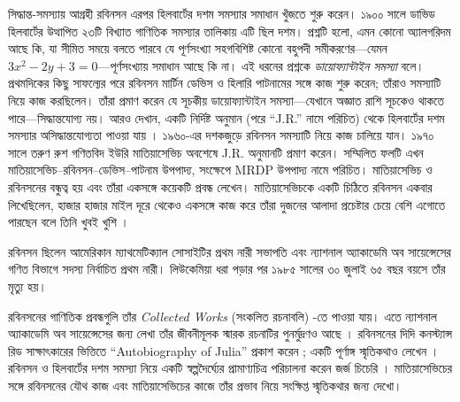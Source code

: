 \documentclass[../../../include/open-logic-section]{subfiles}
\begin{document}
সিদ্ধান্ত-সমস্যায় আগ্রহী রবিনসন এরপর
হিলবার্টের দশম সমস্যার সমাধান খুঁজতে শুরু
করেন। ১৯০০ সালে ডাভিড হিলবার্টের উত্থাপিত
২৩টি বিখ্যাত গাণিতিক সমস্যার তালিকায়
এটি ছিল দশম। প্রশ্নটি হলো, এমন কোনো
অ্যালগরিদম আছে কি, যা সীমিত সময়ে
বলতে পারবে যে পূর্ণসংখ্যা সহগবিশিষ্ট
কোনো বহুপদী সমীকরণের—যেমন
$3x^2 - 2y +3 = 0$—পূর্ণসংখ্যায় সমাধান
আছে কি না। এই ধরনের প্রশ্নকে
\emph{ডায়োফ্যান্টাইন সমস্যা} বলে। প্রথমদিকের
কিছু সাফল্যের পরে রবিনসন মার্টিন ডেভিস
ও হিলারি পাটনামের সঙ্গে কাজ শুরু করেন;
তাঁরাও সমস্যাটি নিয়ে কাজ করছিলেন।
তাঁরা প্রমাণ করেন যে সূচকীয় ডায়োফ্যান্টাইন
সমস্যা—যেখানে অজ্ঞাত রাশি সূচকেও থাকতে
পারে—সিদ্ধান্তযোগ্য নয়। আরও দেখান, একটি
নির্দিষ্ট অনুমান (পরে “J.R.” নামে পরিচিত)
থেকে হিলবার্টের দশম সমস্যার অসিদ্ধান্তযোগ্যতা
পাওয়া যায় \citep{DavisPutnamRobinson1961}।
১৯৬০-এর দশকজুড়ে রবিনসন সমস্যাটি নিয়ে
কাজ চালিয়ে যান। ১৯৭০ সালে তরুণ রুশ
গণিতবিদ ইউরি মাতিয়াসেভিচ অবশেষে J.R.
অনুমানটি প্রমাণ করেন। সম্মিলিত ফলটি এখন
মাতিয়াসেভিচ--রবিনসন--ডেভিস--পাটনাম
উপপাদ্য, সংক্ষেপে MRDP উপপাদ্য নামে
পরিচিত। মাতিয়াসেভিচ ও রবিনসনের বন্ধুত্ব
হয় এবং তাঁরা একসঙ্গে কয়েকটি প্রবন্ধ লেখেন।
মাতিয়াসেভিচকে একটি চিঠিতে রবিনসন একবার
লিখেছিলেন, হাজার হাজার মাইল দূরে থেকেও
একসঙ্গে কাজ করে তাঁরা দুজনের আলাদা
প্রচেষ্টার চেয়ে বেশি এগোতে পারছেন বলে
তিনি খুবই খুশি \citep[45]{Matijasevich1992}।

রবিনসন ছিলেন আমেরিকান ম্যাথমেটিক্যাল
সোসাইটির প্রথম নারী সভাপতি এবং
ন্যাশনাল অ্যাকাডেমি অব সায়েন্সেসের
গণিত বিভাগে সদস্য নির্বাচিত প্রথম নারী। লিউকেমিয়া
ধরা পড়ার পর ১৯৮৫ সালের ৩০ জুলাই
৬৫ বছর বয়সে তাঁর মৃত্যু হয়।

\begin{reading}
রবিনসনের গাণিতিক প্রবন্ধগুলি তাঁর
\textit{Collected Works} (সংকলিত রচনাবলি)
\citep{Robinson1996}-তে পাওয়া যায়।
এতে ন্যাশনাল অ্যাকাডেমি অব সায়েন্সেসের
জন্য লেখা তাঁর জীবনীমূলক স্মারক রচনাটির
পুনর্মুদ্রণও আছে \citep{Feferman1994}।
রবিনসনের দিদি কনস্ট্যান্স রিড সাক্ষাৎকারের
ভিত্তিতে “Autobiography of Julia” প্রকাশ
করেন \citep{Reid1986}; একটি পূর্ণাঙ্গ
স্মৃতিকথাও লেখেন \citep{Reid1996}।
রবিনসন ও হিলবার্টের দশম সমস্যা নিয়ে
একটি স্বল্পদৈর্ঘ্যের প্রামাণ্যচিত্র পরিচালনা
করেন জর্জ চিচেরি \citep{Csicsery2016}।
মাতিয়াসেভিচের সঙ্গে রবিনসনের যৌথ কাজ
এবং মাতিয়াসেভিচের কাজে তাঁর প্রভাব
নিয়ে সংক্ষিপ্ত স্মৃতিকথার জন্য
\citep{Matijasevich1992} দেখো।
\end{reading}
\end{document}
